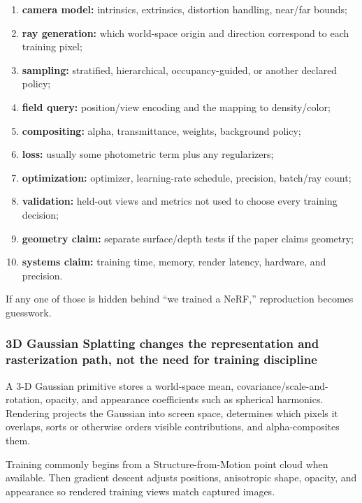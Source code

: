 \begin{enumerate}
\def\labelenumi{\arabic{enumi}.}
\tightlist
\item
  \textbf{camera model:} intrinsics, extrinsics, distortion handling, near/far bounds;
\item
  \textbf{ray generation:} which world-space origin and direction correspond to each training pixel;
\item
  \textbf{sampling:} stratified, hierarchical, occupancy-guided, or another declared policy;
\item
  \textbf{field query:} position/view encoding and the mapping to density/color;
\item
  \textbf{compositing:} alpha, transmittance, weights, background policy;
\item
  \textbf{loss:} usually some photometric term plus any regularizers;
\item
  \textbf{optimization:} optimizer, learning-rate schedule, precision, batch/ray count;
\item
  \textbf{validation:} held-out views and metrics not used to choose every training decision;
\item
  \textbf{geometry claim:} separate surface/depth tests if the paper claims geometry;
\item
  \textbf{systems claim:} training time, memory, render latency, hardware, and precision.
\end{enumerate}

If any one of those is hidden behind ``we trained a NeRF,'' reproduction becomes guesswork.

\subsubsection{3D Gaussian Splatting changes the representation and rasterization path, not the need for training discipline}\label{04-visual-computing-ii-ch035-d-gaussian-splatting-changes-the-representation-and-rasterization-path-not-the-need-for-training-discipline}

A 3-D Gaussian primitive stores a world-space mean, covariance/scale-and-rotation, opacity, and appearance coefficients such as spherical harmonics. Rendering projects the Gaussian into screen space, determines which pixels it overlaps, sorts or otherwise orders visible contributions, and alpha-composites them.

Training commonly begins from a Structure-from-Motion point cloud when available. Then gradient descent adjusts positions, anisotropic shape, opacity, and appearance so rendered training views match captured images.

